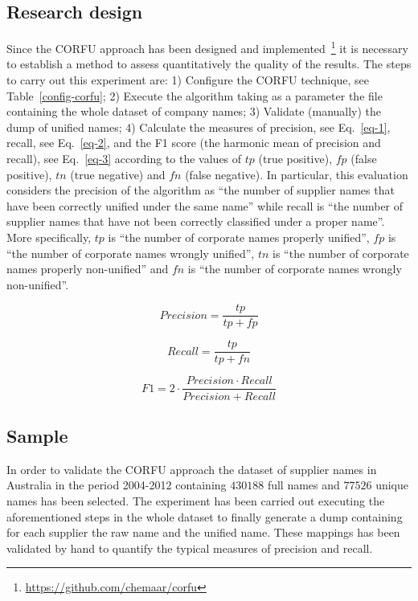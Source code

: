 \documentclass{llncs}
\begin{document}
\subsection{Research design}
Since the CORFU approach has been designed and implemented~\footnote{\url{https://github.com/chemaar/corfu}} it is necessary to 
establish a method to assess quantitatively the quality of the results.  The steps to carry 
out this experiment are: 1) Configure the CORFU technique, see Table~\ref{config-corfu};  
2) Execute the algorithm taking as a parameter the file containing the whole dataset of company names;
3) Validate (manually) the dump of unified names; 4) Calculate the measures of 
precision, see Eq.~\ref{eq-1}, recall, see Eq.~\ref{eq-2}, and the F1 score (the harmonic mean of precision and recall), see Eq.~\ref{eq-3} according to the values of $tp$ (true positive), 
$fp$ (false positive), $tn$ (true negative) and $fn$ (false negative). In particular, this evaluation considers the precision of the algorithm as ``the number of supplier names that have been correctly unified under the same name'' while recall is 
``the number of supplier names that have not been correctly classified under a proper name''.  More specifically, $tp$ is ``the number of corporate names properly unified'', $fp$ is 
``the number of corporate names wrongly unified'', $tn$ is ``the number of corporate names properly non-unified'' and $fn$ is ``the number of corporate names wrongly non-unified''.

\begin{figure}[ht]
\begin{minipage}[b]{0.45\linewidth}
\centering
\begin{equation}\label{eq-1}
Precision = \frac{tp}{tp+fp} 
\end{equation}
\end{minipage}
\hspace{0.5cm}
\begin{minipage}[b]{0.45\linewidth}
\centering
\begin{equation}\label{eq-2}
Recall = \frac{tp}{tp+fn}
\end{equation}
\end{minipage}
\end{figure}


\begin{equation}\label{eq-3}
F1 = 2 \cdot \frac{Precision \cdot Recall}{ Precision + Recall}
\end{equation}


\subsection{Sample}
In order to validate the CORFU approach the dataset of supplier names in Australia 
in the period 2004-2012 containing $430188$ full names 
and $77526$ unique names has been selected. The experiment has been 
carried out executing the aforementioned steps in the whole dataset 
to finally generate a dump containing for each supplier the 
raw name and the unified name. These mappings has been validated 
by hand to quantify the typical measures of precision and recall. 
\end{document}

